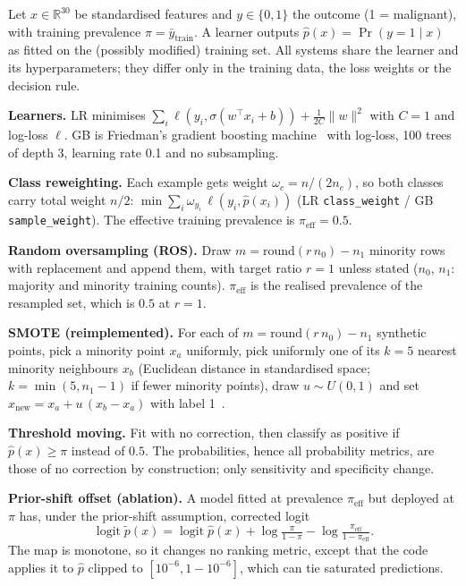 Let $x\in\mathbb{R}^{30}$ be standardised features and $y\in\{0,1\}$ the outcome (1 = malignant), with training prevalence $\pi=\bar y_{\text{train}}$. A learner outputs $\hat p(x)=\Pr(y{=}1\mid x)$ as fitted on the (possibly modified) training set. All systems share the learner and its hyperparameters; they differ only in the training data, the loss weights or the decision rule.

\textbf{Learners.} LR minimises $\sum_i \ell(y_i, \sigma(w^\top x_i+b)) + \tfrac{1}{2C}\|w\|^2$ with $C=1$ and log-loss $\ell$. GB is Friedman's gradient boosting machine~\cite{friedman2001greedy} with log-loss, 100 trees of depth 3, learning rate 0.1 and no subsampling.

\textbf{Class reweighting.} Each example gets weight $\omega_c = n/(2n_c)$, so both classes carry total weight $n/2$: $\min \sum_i \omega_{y_i}\,\ell(y_i,\hat p(x_i))$ (LR \texttt{class\_weight} / GB \texttt{sample\_weight}). The effective training prevalence is $\pi_{\text{eff}}=0.5$.

\textbf{Random oversampling (ROS).} Draw $m=\mathrm{round}(r\,n_0) - n_1$ minority rows with replacement and append them, with target ratio $r=1$ unless stated ($n_0$, $n_1$: majority and minority training counts). $\pi_{\text{eff}}$ is the realised prevalence of the resampled set, which is $0.5$ at $r=1$.

\textbf{SMOTE (reimplemented).} For each of $m=\mathrm{round}(r\,n_0)-n_1$ synthetic points, pick a minority point $x_a$ uniformly, pick uniformly one of its $k=5$ nearest minority neighbours $x_b$ (Euclidean distance in standardised space; $k=\min(5,n_1-1)$ if fewer minority points), draw $u\sim U(0,1)$ and set $x_{\text{new}}=x_a+u\,(x_b-x_a)$ with label 1~\cite{chawla2011smote}.

\textbf{Threshold moving.} Fit with no correction, then classify as positive if $\hat p(x)\ge\pi$ instead of $0.5$. The probabilities, hence all probability metrics, are those of no correction by construction; only sensitivity and specificity change.

\textbf{Prior-shift offset (ablation).} A model fitted at prevalence $\pi_{\text{eff}}$ but deployed at $\pi$ has, under the prior-shift assumption, corrected logit~\cite{pozzolo2015calibrating}
\begin{equation}
\operatorname{logit}\tilde p(x)=\operatorname{logit}\hat p(x)+\log\tfrac{\pi}{1-\pi}-\log\tfrac{\pi_{\text{eff}}}{1-\pi_{\text{eff}}}.
\end{equation}
The map is monotone, so it changes no ranking metric, except that the code applies it to $\hat p$ clipped to $[10^{-6},1-10^{-6}]$, which can tie saturated predictions.

